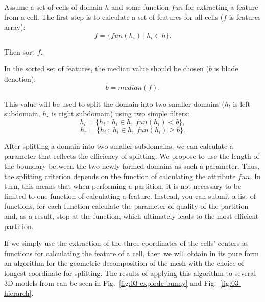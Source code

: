 \documentclass[
11pt,%
tightenlines,%
twoside,%
onecolumn,%
nofloats,%
nobibnotes,%
nofootinbib,%
superscriptaddress,%
noshowpacs,%
centertags]%
{revtex4}
\begin{document}
Assume a set of cells of domain $h$ and some function $fun$ for extracting a feature from a cell.
The first step is to calculate a set of features for all cells ($f$ is features array):
\begin{equation*}
	f = \{fun(h_i)~|~h_i \in h\}.
\end{equation*}

Then sort $f$.

In the sorted set of features, the median value should be chosen ($b$ is blade denotion):
\begin{equation*}
	b = median(f).
\end{equation*}

This value will be used to split the domain into two smaller domains ($h_l$ is left subdomain, $h_r$ is right subdomain) using two simple filters:
\begin{equation*}
	h_l = \{h_i~:~h_i \in h,~fun(h_i) < b\},
\end{equation*}
\begin{equation*}
	h_r = \{h_i~:~h_i \in h,~fun(h_i) \geq b\}.
\end{equation*}

After splitting a domain into two smaller subdomains, we can calculate a parameter that reflects the efficiency of splitting.
We propose to use the length of the boundary between the two newly formed domains as such a parameter.
Thus, the splitting criterion depends on the function of calculating the attribute $fun$.
In turn, this means that when performing a partition, it is not necessary to be limited to one function of calculating a feature.
Instead, you can submit a list of functions, for each function calculate the parameter of quality of the partition and, as a result, stop at the function, which ultimately leads to the most efficient partition.

If we simply use the extraction of the three coordinates of the cells' centers as functions for calculating the feature of a cell, then we will obtain in its pure form an algorithm for the geometric decomposition of the mesh with the choice of longest coordinate for splitting.
The results of applying this algorithm to several 3D models from \cite{Stanford} can be seen in Fig.~\ref{fig:03-explode-bunny} and Fig.~\ref{fig:03-hierarch}.
\end{document}
